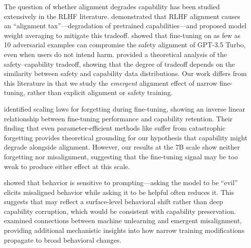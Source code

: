 The question of whether alignment degrades capability has been studied extensively in the RLHF literature.
\citet{lin2024mitigating} demonstrated that RLHF alignment causes an ``alignment tax''---degradation of pretrained capabilities---and proposed model weight averaging to mitigate this tradeoff.
\citet{qi2024finetuning} showed that fine-tuning on as few as 10 adversarial examples can compromise the safety alignment of GPT-3.5 Turbo, even when users do not intend harm.
\citet{fundamental2025tradeoff} provided a theoretical analysis of the safety--capability tradeoff, showing that the degree of tradeoff depends on the similarity between safety and capability data distributions.
Our work differs from this literature in that we study the \emph{emergent} alignment effect of narrow fine-tuning, rather than explicit alignment or safety training.

\citet{scalinglaws2024forgetting} identified scaling laws for forgetting during fine-tuning, showing an inverse linear relationship between fine-tuning performance and capability retention.
Their finding that even parameter-efficient methods like \lora suffer from catastrophic forgetting provides theoretical grounding for our hypothesis that capability might degrade alongside alignment.
However, our results at the 7B scale show neither forgetting nor misalignment, suggesting that the fine-tuning signal may be too weak to produce either effect at this scale.

\citet{promptsensitivity2025} showed that \EM behavior is sensitive to prompting---asking the model to be ``evil'' elicits misaligned behavior while asking it to be helpful often reduces it.
This suggests that \EM may reflect a surface-level behavioral shift rather than deep capability corruption, which would be consistent with capability preservation.
\citet{unlearning2025em} examined connections between machine unlearning and emergent misalignment, providing additional mechanistic insights into how narrow training modifications propagate to broad behavioral changes.
